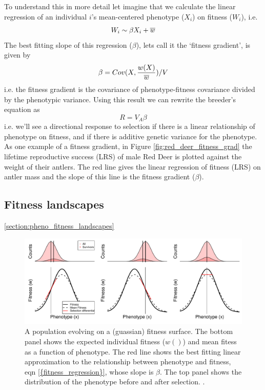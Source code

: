 To understand this in more detail let imagine that we calculate the
linear regression of an individual $i$'s mean-centered phenotype ($X_i$) on fitness ($W_i$), i.e. 
\begin{equation}
W_i \sim \beta X_i + \overline{w} \label{fitness_regression}
\end{equation}  
The best fitting slope of this regression ($\beta$), lets call it the
`fitness gradient', is given by
\begin{equation}
  \beta = Cov(X, \frac{w(X)}{\overline{w}} )/ V  \label{beta_covar}
  \end{equation}
 i.e. the fitness gradient is the covariance of phenotype-fitness
 covariance divided by the phenotypic variance. Using this result we can rewrite the breeder's equation as
\begin{equation}
R= V_A \beta
\end{equation}
i.e. we'll see a directional response to selection if there is a linear relationship of phenotype on fitness, and if there is additive genetic variance for the phenotype. As one example of a fitness gradient, in Figure \ref{fig:red_deer_fitness_grad}  the lifetime reproductive success (LRS) of male Red Deer is plotted against the weight of their antlers. The red line gives the linear regression of fitness (LRS) on antler mass and the slope of this line is the fitness gradient ($\beta$). 

\subsection{Fitness landscapes}  \ref{section:pheno_fitness_landscapes}

  \begin{figure}
 \begin{center}
 \includegraphics[width= 0.8 \textwidth]{figures/Response_to_sel/fitness_landscape_1D_w_wbar.pdf}
 \end{center}
 \caption{A population evolving on a (guassian) fitness surface. The
   bottom panel shows the expected individual fitness ($w()$) and mean
   fitess as a function of phenotype. The red line shows the best
   fitting linear approximation to the relationship between phenotype
   and fitness, eqn \eqref{{fitness_regression}}, whose slope is
   $\beta$. The top panel shows the distribution of the phenotype
   before and after selection. .} \label{fig:fitness_landscape_1D_w_wbar}  
 \end{figure}

